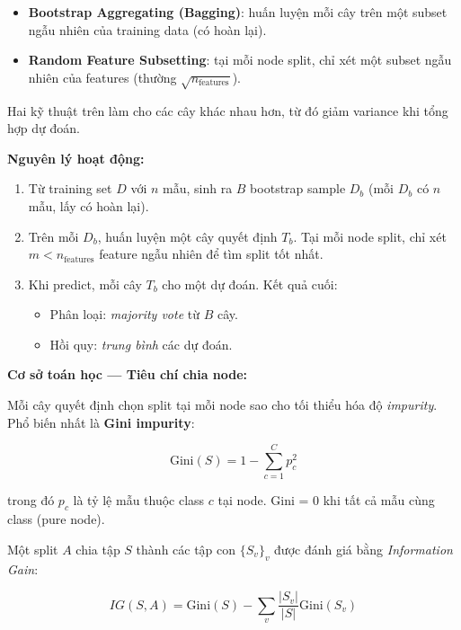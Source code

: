 \documentclass[12pt, a4paper]{article}
\begin{document}
\begin{itemize}
    \item \textbf{Bootstrap Aggregating (Bagging)}: huấn luyện mỗi cây trên một subset ngẫu nhiên của training data (có hoàn lại).
    \item \textbf{Random Feature Subsetting}: tại mỗi node split, chỉ xét một subset ngẫu nhiên của features (thường $\sqrt{n_{\text{features}}}$).
\end{itemize}

Hai kỹ thuật trên làm cho các cây khác nhau hơn, từ đó giảm variance khi tổng hợp dự đoán.

\textbf{Nguyên lý hoạt động:}

\begin{enumerate}
    \item Từ training set $D$ với $n$ mẫu, sinh ra $B$ bootstrap sample $D_b$ (mỗi $D_b$ có $n$ mẫu, lấy có hoàn lại).
    \item Trên mỗi $D_b$, huấn luyện một cây quyết định $T_b$. Tại mỗi node split, chỉ xét $m < n_{\text{features}}$ feature ngẫu nhiên để tìm split tốt nhất.
    \item Khi predict, mỗi cây $T_b$ cho một dự đoán. Kết quả cuối:
    \begin{itemize}
        \item Phân loại: \emph{majority vote} từ $B$ cây.
        \item Hồi quy: \emph{trung bình} các dự đoán.
    \end{itemize}
\end{enumerate}

\textbf{Cơ sở toán học --- Tiêu chí chia node:}

Mỗi cây quyết định chọn split tại mỗi node sao cho tối thiểu hóa độ \emph{impurity}. Phổ biến nhất là \textbf{Gini impurity}:

\begin{equation}
\text{Gini}(S) = 1 - \sum_{c=1}^{C} p_c^2
\end{equation}

trong đó $p_c$ là tỷ lệ mẫu thuộc class $c$ tại node. Gini = 0 khi tất cả mẫu cùng class (pure node).

Một split $A$ chia tập $S$ thành các tập con $\{S_v\}_v$ được đánh giá bằng \emph{Information Gain}:

\begin{equation}
IG(S, A) = \text{Gini}(S) - \sum_v \frac{|S_v|}{|S|} \text{Gini}(S_v)
\end{equation}
\end{document}
